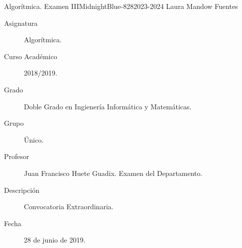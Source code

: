 \documentclass[12pt]{article}
\begin{document}

    
    
    {Algorítmica. Examen III}{MidnightBlue}{-8}{28}{2023-2024}
    {Laura Mandow Fuentes}

    \begin{description}
        \item[Asignatura] Algorítmica.
        \item[Curso Académico] 2018/2019.
        \item[Grado] Doble Grado en Ingienería Informática y Matemáticas.
        \item[Grupo] Único.
        \item[Profesor] Juan Francisco Huete Guadix. Examen del Departamento.
        \item[Descripción] Convocatoria Extraordinaria. 
        \item[Fecha] 28 de junio de 2019.
    
    \end{description}
    \newpage
    
\end{document}
